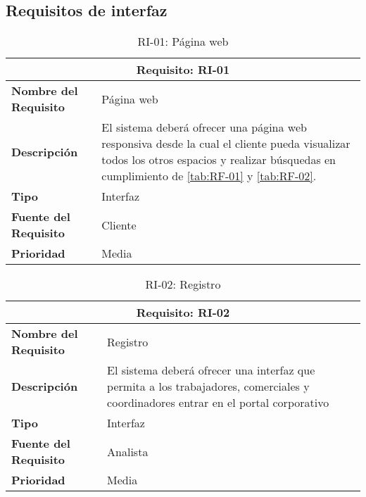 \newpage
\subsection{Requisitos de interfaz}

\begin{table}[H]
\begin{center}
\begin{tabular}{p{} p{7cm}}
\multicolumn{2}{c}{\textbf{Requisito: RI-01} } \\
\hline \hline
\textbf{Nombre del Requisito} & Página web  \\
\hline
\textbf{Descripción} & El sistema deberá ofrecer una página web responsiva desde la cual el cliente pueda visualizar todos los otros espacios y realizar búsquedas en cumplimiento de \ref{tab:RF-01} y \ref{tab:RF-02}.  \\
\hline
\textbf{Tipo} & Interfaz \\
\hline
\textbf{Fuente del Requisito} & Cliente  \\
\hline
\textbf{Prioridad} & Media  \\ \hline
\end{tabular}
\caption{RI-01: Página web}
\label{tab:RI-01}
\end{center}
\end{table}

\begin{table}[H]
\begin{center}
\begin{tabular}{p{} p{7cm}}
\multicolumn{2}{c}{\textbf{Requisito: RI-02} } \\
\hline \hline
\textbf{Nombre del Requisito} & Registro  \\
\hline
\textbf{Descripción} & El sistema deberá ofrecer una interfaz que permita a los trabajadores, comerciales y coordinadores entrar en el portal corporativo \\
\hline
\textbf{Tipo} & Interfaz \\
\hline
\textbf{Fuente del Requisito} & Analista \\
\hline
\textbf{Prioridad} & Media  \\ \hline
\end{tabular}
\caption{RI-02: Registro}
\label{tab:RI-02}
\end{center}
\end{table}

